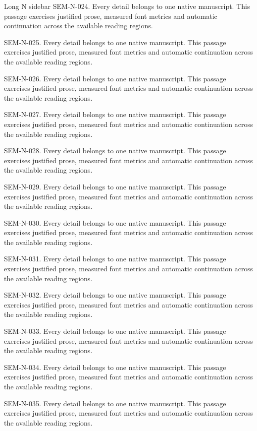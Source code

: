 \begin{m20sidebar}[id=long-narrow]{Long N sidebar}
SEM-N-024. Every detail belongs to one native manuscript. This passage exercises justified prose, measured font metrics and automatic continuation across the available reading regions.\par
SEM-N-025. Every detail belongs to one native manuscript. This passage exercises justified prose, measured font metrics and automatic continuation across the available reading regions.\par
SEM-N-026. Every detail belongs to one native manuscript. This passage exercises justified prose, measured font metrics and automatic continuation across the available reading regions.\par
SEM-N-027. Every detail belongs to one native manuscript. This passage exercises justified prose, measured font metrics and automatic continuation across the available reading regions.\par
SEM-N-028. Every detail belongs to one native manuscript. This passage exercises justified prose, measured font metrics and automatic continuation across the available reading regions.\par
SEM-N-029. Every detail belongs to one native manuscript. This passage exercises justified prose, measured font metrics and automatic continuation across the available reading regions.\par
SEM-N-030. Every detail belongs to one native manuscript. This passage exercises justified prose, measured font metrics and automatic continuation across the available reading regions.\par
SEM-N-031. Every detail belongs to one native manuscript. This passage exercises justified prose, measured font metrics and automatic continuation across the available reading regions.\par
SEM-N-032. Every detail belongs to one native manuscript. This passage exercises justified prose, measured font metrics and automatic continuation across the available reading regions.\par
SEM-N-033. Every detail belongs to one native manuscript. This passage exercises justified prose, measured font metrics and automatic continuation across the available reading regions.\par
SEM-N-034. Every detail belongs to one native manuscript. This passage exercises justified prose, measured font metrics and automatic continuation across the available reading regions.\par
SEM-N-035. Every detail belongs to one native manuscript. This passage exercises justified prose, measured font metrics and automatic continuation across the available reading regions.\par

\end{m20sidebar}
